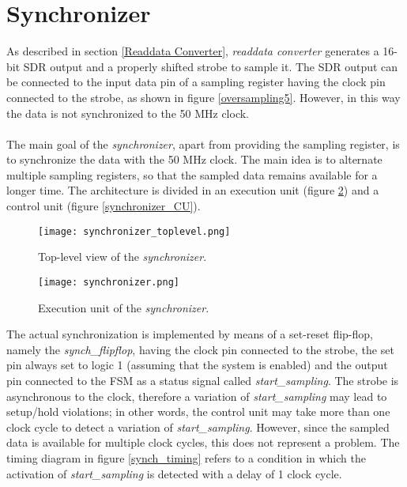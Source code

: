 \documentclass[10pt, english, a4paper, titlepage, oneside]{book}
\begin{document}
\section{Synchronizer} \label{Synchronizer}
\vspace{2mm}
As described in section \ref{Readdata Converter}, \textit{readdata converter} generates a 16-bit SDR output and a properly shifted strobe to sample it. The SDR output can be connected to the input data pin of a sampling register having the clock pin connected to the strobe, as shown in figure \ref{oversampling5}. However, in this way the data is not synchronized to the 50 MHz clock. \\ \\
The main goal of the \textit{synchronizer}, apart from providing the sampling register, is to synchronize the data with the 50 MHz clock. The main idea is to alternate multiple sampling registers, so that the sampled data remains available for a longer time. The architecture is divided in an execution unit (figure \ref{synchronizer_EU}) and a control unit (figure \ref{synchronizer_CU}).
\vspace{4mm}
\begin{figure}[H]
    \centering
    \captionsetup{width=10cm}
    \texttt{[image: synchronizer\_toplevel.png]}
    \vspace{2mm}
    \caption{\centering Top-level view of the \textit{synchronizer}.}
    \label{synchronizer_toplevel}
\end{figure}
\vspace{2mm}
\begin{figure}[H]
    \centering
    \captionsetup{width=10cm}
    \texttt{[image: synchronizer.png]}
    \caption{\centering Execution unit of the \textit{synchronizer}.}
    \label{synchronizer_EU}
\end{figure}
\vspace{4mm}
\noindent The actual synchronization is implemented by means of a set-reset flip-flop, namely the \textit{synch\_flipflop}, having the clock pin connected to the strobe, the set pin always set to logic 1 (assuming that the system is enabled) and the output pin connected to the FSM as a status signal called \textit{start\_sampling}. The strobe is asynchronous to the clock, therefore a variation of \textit{start\_sampling} may lead to setup/hold violations; in other words, the control unit may take more than one clock cycle to detect a variation of \textit{start\_sampling}. However, since the sampled data is available for multiple clock cycles, this does not represent a problem. The timing diagram in figure \ref{synch_timing} refers to a condition in which the activation of \textit{start\_sampling} is detected with a delay of 1 clock cycle.
\end{document}
